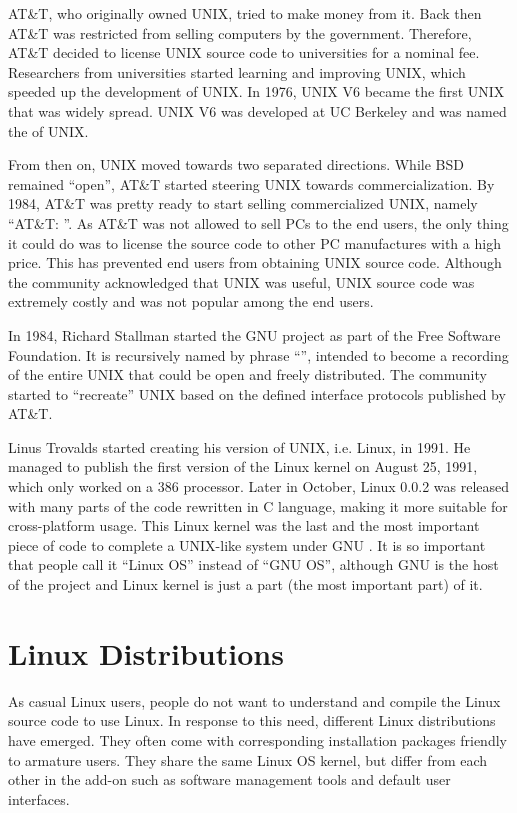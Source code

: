 AT\&T, who originally owned UNIX, tried to make money from it. Back then AT\&T was restricted from selling computers by the government. Therefore, AT\&T decided to license UNIX source code to universities for a nominal fee. Researchers from universities started learning and improving UNIX, which speeded up the development of UNIX. In 1976, UNIX V6 became the first UNIX that was widely spread. UNIX V6 was developed at UC Berkeley and was named the  of UNIX.

From then on, UNIX moved towards two separated directions. While BSD remained ``open'', AT\&T started steering UNIX towards commercialization. By 1984, AT\&T was pretty ready to start selling commercialized UNIX, namely ``AT\&T: ''. As AT\&T was not allowed to sell PCs to the end users, the only thing it could do was to license the source code to other PC manufactures with a high price. This has prevented end users from obtaining UNIX source code. Although the community acknowledged that UNIX was useful, UNIX source code was extremely costly and was not popular among the end users.

In 1984, Richard Stallman started the GNU project as part of the Free Software Foundation. It is recursively named by phrase ``'', intended to become a recording of the entire UNIX that could be open and freely distributed. The community started to ``recreate'' UNIX based on the defined interface protocols published by AT\&T.

Linus Trovalds started creating his version of UNIX, i.e. Linux, in 1991. He managed to publish the first version of the Linux kernel on August 25, 1991, which only worked on a 386 processor. Later in October, Linux 0.0.2 was released with many parts of the code rewritten in C language, making it more suitable for cross-platform usage. This Linux kernel was the last and the most important piece of code to complete a UNIX-like system under GNU . It is so important that people call it ``Linux OS'' instead of ``GNU OS'', although GNU is the host of the project and Linux kernel is just a part (the most important part) of it.

\section{Linux Distributions}

As casual Linux users, people do not want to understand and compile the Linux source code to use Linux. In response to this need, different Linux distributions have emerged. They often come with corresponding installation packages friendly to armature users. They share the same Linux OS kernel, but differ from each other in the add-on such as software management tools and default user interfaces.

